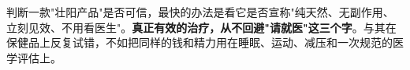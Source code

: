 \begin{tcolorbox}[colback=yellow!10!white,colframe=orange!70!black,title=科学提示]
判断一款"壮阳产品"是否可信，最快的办法是看它是否宣称"纯天然、无副作用、立刻见效、不用看医生"。\textbf{真正有效的治疗，从不回避"请就医"这三个字}。与其在保健品上反复试错，不如把同样的钱和精力用在睡眠、运动、减压和一次规范的医学评估上。
\end{tcolorbox}
